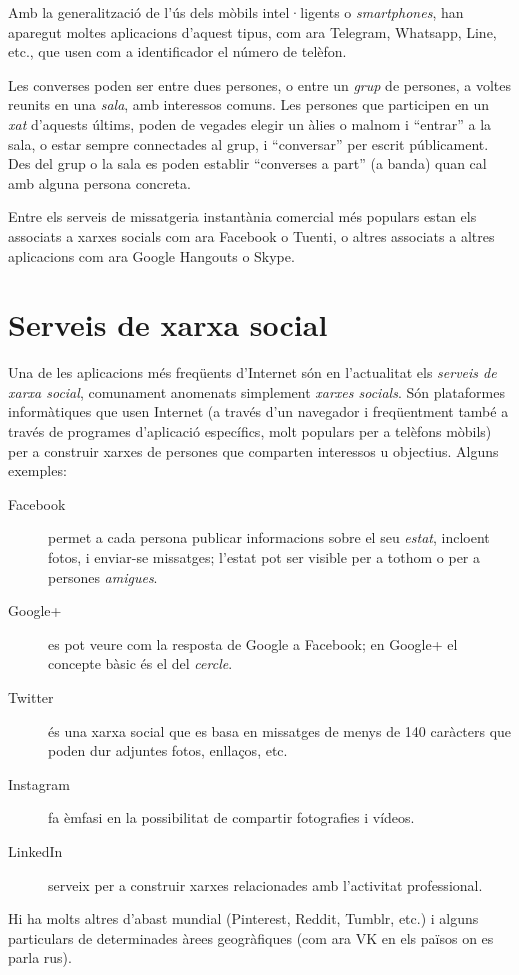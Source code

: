 Amb la generalització de l'ús dels mòbils intel·ligents o
\emph{smartphones}, han aparegut moltes aplicacions d'aquest tipus,
com ara Telegram, Whatsapp, Line, etc., que usen com a identificador
el número de telèfon.

Les converses poden ser entre dues persones, o entre un \emph{grup} de
persones, a voltes reunits en una \emph{sala}, amb interessos comuns.
Les persones que participen en un \emph{xat} d'aquests últims, poden
de vegades elegir un àlies o malnom i ``entrar'' a la sala, o estar
sempre connectades al grup, i ``conversar'' per escrit
públicament. Des del grup o la sala es poden establir ``converses a
part'' (a banda) quan cal amb alguna persona concreta.

Entre els serveis de missatgeria instantània comercial més populars
estan els associats a xarxes socials com ara Facebook o Tuenti, o
altres associats a altres aplicacions com ara Google Hangouts o Skype.

\section{Serveis de xarxa social}
\label{ss:xarsessocials}
Una de les aplicacions més freqüents d'Internet són en l'actualitat
els \emph{serveis de xarxa social}, comunament anomenats simplement
\emph{xarxes socials}. Són plataformes informàtiques que usen Internet
(a través d'un navegador i freqüentment també a través de programes
d'aplicació específics, molt populars per a telèfons mòbils) per a
construir xarxes de persones que comparten interessos u
objectius. Alguns exemples:
\begin{description}
\item[Facebook] permet a cada persona publicar informacions sobre el
  seu \emph{estat}, incloent fotos, i enviar-se missatges; l'estat pot
  ser visible per a tothom o per a persones \emph{amigues}.
\item[Google+] es pot veure com la resposta de Google a Facebook; en
  Google+ el concepte bàsic és el del \emph{cercle}.
\item[Twitter] és una xarxa social que es basa en missatges de menys
  de 140 caràcters que poden dur adjuntes fotos, enllaços, etc.
\item[Instagram] fa èmfasi en la possibilitat de compartir fotografies
  i vídeos.
\item[LinkedIn] serveix per a construir xarxes relacionades amb
  l'activitat professional.
\end{description}
Hi ha molts altres d'abast mundial (Pinterest, Reddit, Tumblr, etc.) i
alguns particulars de determinades àrees geogràfiques (com ara VK en
els països on es parla rus).

